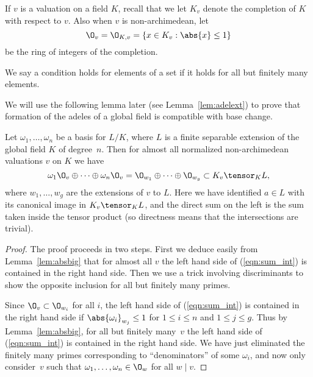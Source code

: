 \documentclass[11pt]{book}
\begin{document}
\begin{ch}
If $v$ is a valuation on a field $K$, recall that
we let $K_v$ denote the completion of $K$ with respect to $v$. Also when
$v$ is non-archimedean, let
$$
  \O_v = \O_{K,v} = \{x \in K_v : \abs{x} \leq 1\}
$$
be the ring of integers of the completion.

\begin{definition}
We say a condition holds for  elements
of a set if it holds for all but finitely many elements.
\end{definition}

We will use the following lemma later (see Lemma~\ref{lem:adelext}) to
prove that formation of the adeles of a global field
is compatible with base change.
\begin{lemma} \label{lem:ints_adeles}
Let $\omega_1,\ldots, \omega_n$ be a basis for $L/K$,
where $L$ is a finite separable extension of the global field
$K$ of degree~$n$.
Then for almost all normalized non-archimedean valuations $v$ on $K$ we
have
\begin{equation}\label{eqn:sum_int}
   \omega_1 \O_{v} \oplus \cdots \oplus \omega_n \O_{v}
      = \O_{w_1} \oplus \cdots \oplus \O_{w_g}
      \subset K_v\tensor_K L,
\end{equation}
where $w_1,\ldots, w_g$ are the extensions of $v$
to $L$.   Here we have identified $a\in L$ with
its canonical image in $K_v\tensor_K L$, and the direct
sum on the left is the sum taken inside the tensor
product (so directness means that the intersections are
trivial).
\end{lemma}
\begin{proof}
  The proof proceeds in two steps.  First we deduce easily from
  Lemma~\ref{lem:absbig} that for almost all $v$ the left hand side
of (\ref{eqn:sum_int}) is
  contained in the right hand side.  Then we use a trick involving
  discriminants to show the opposite inclusion for all but finitely
  many primes.

  Since $\O_v\subset \O_{w_i}$ for all $i$, the left hand side of
  (\ref{eqn:sum_int}) is contained in the right hand side if
  $\abs{\omega_i}_{w_j}\leq 1$ for $1\leq i\leq n$ and $1\leq j\leq
  g$.  Thus by Lemma~\ref{lem:absbig}, for all but finitely many~$v$
  the left hand side of (\ref{eqn:sum_int}) is contained in the right
  hand side.  We have just eliminated the finitely many primes
  corresponding to ``denominators'' of some $\omega_i$, and now only
  consider~$v$ such that $\omega_1,\ldots, \omega_n \in \O_{w}$ for
  all $w\mid v$.


\end{proof}
\end{ch}
\end{document}
